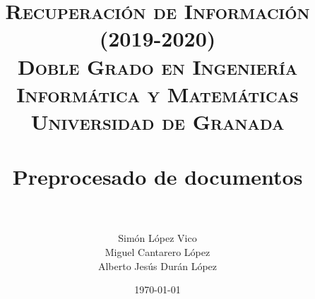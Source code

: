 
\usepackage{listings}

\title{	
\normalfont \normalsize 
\textsc{\textbf{Recuperación de Información (2019-2020)} \\ Doble Grado en Ingeniería Informática y Matemáticas \\ Universidad de Granada} \\ [25pt] %
\horrule{0.5pt} \\[0.4cm] %
\huge Preprocesado de documentos \\ %
\horrule{2pt} \\[0.5cm] %
}
\author{Simón López Vico \\ Miguel Cantarero López \\ Alberto Jesús Durán López} %
\date{\normalsize\today} %


\lstset{
	language=java,
	breaklines=true,
	basicstyle=\footnotesize,
	frame=single
}





\maketitle %

\newpage %

